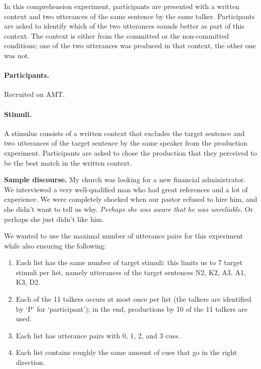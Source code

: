 \documentclass[dina4,12pt,fleqn]{article}
\newcommand{\6}{\mbox{$[\hspace*{-.6mm}[$}}
\newcommand{\9}{\mbox{$]\hspace*{-.6mm}]$}}
\begin{document}
In this comprehension experiment, participants are presented with a written context and two utterances of the same sentence by the same talker. Participants are asked to identify which of the two utterances sounds better as part of this context. The context is either from the committed or the non-committed conditions; one of the two utterances was produced in that context, the other one was not.

\paragraph{Participants.} Recruited on AMT.

\paragraph{Stimuli.} A stimulus consists of a written context that excludes the target sentence and two utterances of the target sentence by the same speaker from the production experiment. Participants are asked to chose the production that they perceived to be the best match in the written context.

\begin{exe}
\ex \textbf{Sample discourse. }My church was looking for a new financial administrator. We interviewed a
very well-qualified man who had great references and a lot of
experience. We were completely shocked when our pastor refused to hire
him, and she didn't want to tell us why. \textit{Perhaps she was aware that he was unreliable.} Or perhaps she just didn't like him. 
\end{exe}

We wanted to use the maximal number of utterance pairs for this experiment while also ensuring the following:

\begin{enumerate}[noitemsep]
\item Each list has the same number of target stimuli: this limits us to 7 target stimuli per list, namely utterances of the target sentences N2, K2, A3, A1, K3, D2.
    \item Each of the 11 talkers occurs at most once per list (the talkers are identified by `P' for `participant'); in the end, productions by 10 of the 11 talkers are used.
    \item Each list has utterance pairs with 0, 1, 2, and 3 cues.
    \item Each list contains roughly the same amount of cues that go in the right direction.
\end{enumerate}
\end{document}
